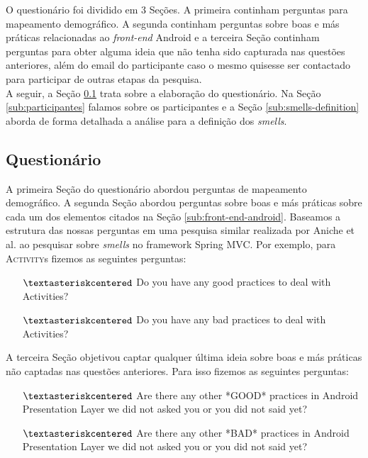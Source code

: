 O question\'ario foi dividido em 3 Se\c{c}\~oes. A primeira continham perguntas para mapeamento demogr\'afico. A segunda continham perguntas sobre boas e m\'as pr\'aticas relacionadas ao \textit{front-end} Android e a terceira Se\c{c}\~ao continham perguntas para obter alguma ideia que n\~ao tenha sido capturada nas quest\~oes anteriores, al\'em do email do participante caso o mesmo quisesse ser contactado para participar de outras etapas da pesquisa. \\

A seguir, a Se\c{c}\~ao \ref{sub:questionario} trata sobre a elabora\c{c}\~ao do question\'ario. Na Se\c{c}\~ao \ref{sub:participantes} falamos sobre os participantes e a Se\c{c}\~ao \ref{sub:smells-definition} aborda de forma detalhada a an\'alise para a defini\c{c}\~ao dos \textit{smells}.


\subsection{Question\'ario}
\label{sub:questionario}

A primeira Se\c{c}\~ao do question\'ario abordou perguntas de mapeamento demogr\'afico. A segunda Se\c{c}\~ao abordou perguntas sobre boas e m\'as pr\'aticas sobre cada um dos elementos citados na Se\c{c}\~ao \ref{sub:front-end-android}. Baseamos a estrutura das nossas perguntas em uma pesquisa similar realizada por Aniche et al. \cite{MvcSmells:16} ao pesquisar sobre \textit{smells} no framework Spring MVC. Por exemplo, para \textsc{Activity}s fizemos as seguintes perguntas: 

\begin{itemize} 
	\item[$\textasteriskcentered$] Do you have any good practices to deal with Activities?
	\item[$\textasteriskcentered$] Do you have any bad practices to deal with Activities? 
\end{itemize}

A terceira Se\c{c}\~ao objetivou captar qualquer \'ultima ideia sobre boas e m\'as pr\'aticas n\~ao captadas nas quest\~oes anteriores. Para isso fizemos as seguintes perguntas: 

\begin{itemize} 
	\item[$\textasteriskcentered$] Are there any other *GOOD* practices in Android Presentation Layer we did not asked you or you did not said yet?
	\item[$\textasteriskcentered$] Are there any other *BAD* practices in Android Presentation Layer we did not asked you or you did not said yet?
\end{itemize}


